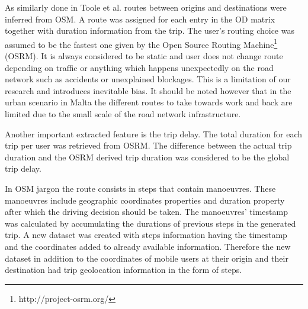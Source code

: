 \documentclass[12pt, a4paper]{report}
\theoremstyle{definition}
\theoremstyle{definition}%
\theoremstyle{definition}%
\theoremstyle{definition}%
\theoremstyle{definition}%
\theoremstyle{definition}%
\begin{document}

As similarly done in Toole et al. \cite{Toole2015} routes between origins and destinations were inferred from OSM. A route was assigned for each entry in the OD matrix together with duration information from the trip. The user's routing choice was assumed to be the fastest one given by the Open Source Routing Machine\footnote{http://project-osrm.org/} (OSRM). It is always considered to be static and user does not change route depending on traffic or anything which happens unexpectedly on the road network such as accidents or unexplained blockages. This is a limitation of our research and introduces inevitable bias. It should be noted however that in the urban scenario in Malta the different routes to take towards work and back are limited due to the small scale of the road network infrastructure. 

Another important extracted feature is the trip delay. The total duration for each trip per user was retrieved from OSRM. The difference between the actual trip duration and the OSRM derived trip duration was considered to be the global trip delay.

In OSM jargon the route consists in steps that contain manoeuvres. These manoeuvres include geographic coordinates properties and duration property after which the driving decision should be taken. The manoeuvres' timestamp was calculated by accumulating the durations of previous steps in the generated trip. A new dataset was created with steps information having the timestamp and the coordinates added to already available information. Therefore the new dataset in addition to the coordinates of mobile users at their origin and their destination had trip geolocation information in the form of steps.
 

\end{document}
